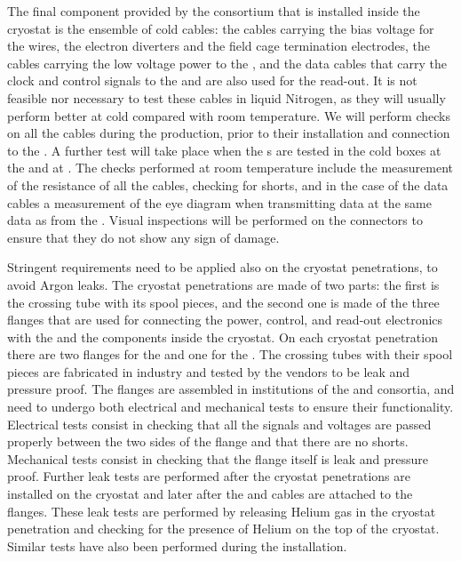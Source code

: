 The final component provided by the  consortium
that is installed inside the cryostat is the ensemble of cold
cables: the cables carrying the bias voltage for the 
wires, the electron diverters and the field cage termination electrodes,
the cables carrying the low voltage power to the ,
and the data cables that carry the clock and control signals
to the  and are also used for the read-out. It is not
feasible nor necessary to test these cables in liquid Nitrogen,
as they will usually perform better at cold compared with
room temperature. We will perform checks on all the cables 
during the production, prior to their installation and 
connection to the . A further test will take place
when the s are tested in the cold boxes at the 
and at \surf. The checks performed at room temperature include
the measurement of the resistance of all the cables, checking for
shorts, and in the case of the data cables a measurement of the
eye diagram when transmitting data at the same data as from the
. Visual inspections will be performed on the connectors
to ensure that they do not show any sign of damage.

Stringent requirements need to be applied also on the cryostat
penetrations, to avoid Argon leaks. The cryostat penetrations are
made of two parts: the first is the crossing tube with its spool pieces,
and the second one is made of the three flanges that are used for
connecting the power, control, and read-out electronics with the
 and the  components inside the
cryostat. On each cryostat penetration there are two flanges for
the  and one for the . The crossing
tubes with their spool pieces are fabricated in industry and tested
by the vendors to be leak and pressure proof. The flanges are assembled
in institutions of the  and  consortia,
and need to undergo both electrical and mechanical tests to ensure their
functionality. Electrical tests consist in checking that all the
signals and voltages are passed properly between the two sides of the
flange and that there are no shorts. Mechanical tests consist in 
checking that the flange itself is leak and pressure proof. Further
leak tests are performed after the cryostat penetrations are installed
on the cryostat and later after the  and 
cables are attached to the flanges. These leak tests are
performed by releasing Helium gas in the cryostat penetration and
checking for the presence of Helium on the top of the cryostat. Similar
tests have also been performed during the  installation.

